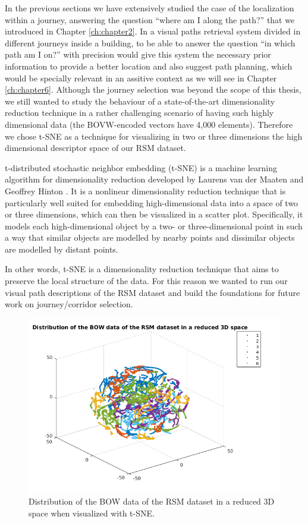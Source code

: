 In the previous sections we have extensively studied the case of the localization within a journey, answering the question ``where am I along the path?'' that we introduced in Chapter \ref{ch:chapter2}. In a visual paths retrieval system divided in different journeys inside a building, to be able to answer the question ``in which path am I on?'' with precision would give this system the necessary prior information to provide a better location and also suggest path planning, which would be specially relevant in an assitive context as we will see in Chapter \ref{ch:chapter6}. Although the journey selection was beyond the scope of this thesis, we still wanted to study the behaviour of a state-of-the-art dimensionality reduction technique in a rather challenging scenario of having such highly dimensional data (the BOVW-encoded vectors have 4,000 elements). Therefore we chose t-SNE as a technique for visualizing in two or three dimensions the high dimensional descriptor space of our RSM dataset.

t-distributed stochastic neighbor embedding (t-SNE) is a machine learning algorithm for dimensionality reduction developed by Laurens van der Maaten and Geoffrey Hinton \cite{maaten2009learning}. It is a nonlinear dimensionality reduction technique that is particularly well suited for embedding high-dimensional data into a space of two or three dimensions, which can then be visualized in a scatter plot. Specifically, it models each high-dimensional object by a two- or three-dimensional point in such a way that similar objects are modelled by nearby points and dissimilar objects are modelled by distant points.

In other words, t-SNE is a dimensionality reduction technique that aims to preserve the local structure of the data. For this reason we wanted to run our visual path descriptions of the RSM dataset and build the foundations for future work on journey/corridor selection.

\begin{figure}
\centering
\includegraphics[width=\textwidth]{gfx/Chapter04/visual_paths.png}
\caption{Distribution of the BOW data of the RSM dataset in a reduced 3D space when visualized with t-SNE.}
\label{fig:tsne3d}
\end{figure}

